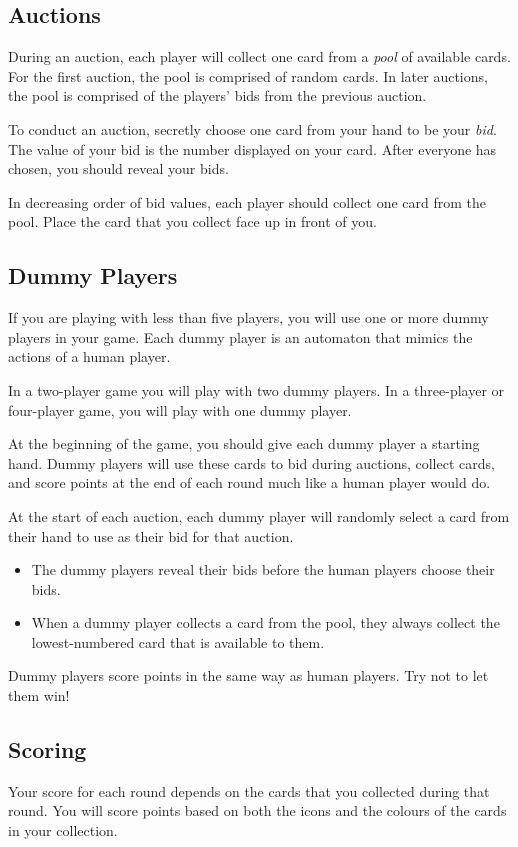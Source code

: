 \documentclass[a6paper, parskip=half, DIV=14, 10pt]{scrartcl}
\begin{document}
\subsection*{Auctions}
During an auction, each player will collect one card from a \emph{pool} of available cards.
For the first auction, the pool is comprised of random cards.
In later auctions, the pool is comprised of the players' bids from the previous auction.

To conduct an auction, secretly choose one card from your hand to be your \emph{bid}.
The value of your bid is the number displayed on your card.
After everyone has chosen, you should reveal your bids.

In decreasing order of bid values, each player should collect one card from the pool.
Place the card that you collect face up in front of you.

\newpage

\subsection*{Dummy Players}
If you are playing with less than five players, you will use one or more dummy players in your game.
Each dummy player is an automaton that mimics the actions of a human player.

In a two-player game you will play with two dummy players. In a three-player or four-player game, you will play with one dummy player.

At the beginning of the game, you should give each dummy player a starting hand. Dummy players will use these cards to bid during auctions, collect cards, and score points at the end of each round much like a human player would do.

At the start of each auction, each dummy player will randomly select a card from their hand to use as their bid for that auction.
\begin{itemize}[leftmargin=*]
\item The dummy players reveal their bids before the human players choose their bids. 
\item When a dummy player collects a card from the pool, they always collect the lowest-numbered card that is available to them.
\end{itemize}
Dummy players score points in the same way as human players. Try not to let them win!

\newpage

\subsection*{Scoring}
Your score for each round depends on the cards that you collected during that round.
You will score points based on both the icons and the colours of the cards in your collection.
\end{document}
